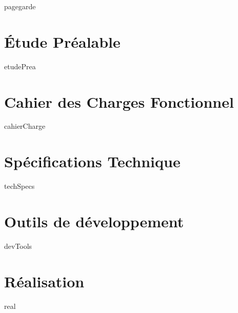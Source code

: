 \documentclass[a4paper, 12pt, titlepage, oneside, french]{article}
\begin{document}
{pagegarde}
\newpage

\tableofcontents
\newpage

\section{Étude Préalable}
{etudePrea}
\newpage

\section{Cahier des Charges Fonctionnel}
{cahierCharge}
\newpage

\section{Spécifications Technique}
{techSpecs}
\newpage

\section{Outils de développement}
{devTools}
\newpage

\section{Réalisation}
{real}
\newpage

\printglossary[title=Acronymes,type=\acronymtype]
\newpage 
\printglossary
\newpage 

\printbibliography
\end{document}
